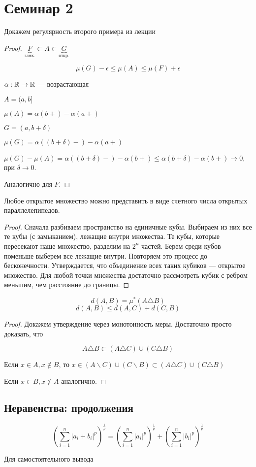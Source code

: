 \section{Семинар 2}

Докажем регулярность второго примера из лекции

\begin{proof}
  $\underbrace{F}_{\text{замк.}} \subset A \subset \underbrace{G}_{\text{откр.}}$

  $$\mu(G) - \epsilon \leq \mu(A) \leq \mu(F) + \epsilon$$

  $\alpha: \mathbb{R} \to \mathbb{R}$ --- возрастающая

  $A = (a, b]$

  $\mu(A) = \alpha(b+) - \alpha(a+)$

  $G = (a, b+\delta)$

  $\mu(G) = \alpha((b + \delta)-) - \alpha(a+)$

  $\mu(G) - \mu(A) = \alpha((b + \delta)-) - \alpha(b+) \leq \alpha(b + \delta) - \alpha(b+) \to 0$, при $\delta \to 0$.

  Аналогично для $F$.
\end{proof}

\begin{theorem}
  Любое открытое множество можно представить в виде счетного числа открытых параллелепипедов.
\end{theorem}

\begin{proof}
  Сначала разбиваем пространство на единичные кубы. Выбираем из них все те кубы (с замыканием), лежащие внутри множества.
  Те кубы, которые пересекают наше множество, разделим на $2^n$ частей. Берем среди кубов поменьше выберем все лежащие внутри.
  Повторяем это процесс до бесконечности. Утверждается, что объединение всех таких кубиков --- открытое множество. 
  Для любой точки множества достаточно рассмотреть кубик с ребром меньшим, чем расстояние до границы. 
\end{proof}

\begin{problem}
  $$d(A, B) = \mu^*(A \triangle B)$$
  $$d(A, B) \leq d(A, C) + d(C, B)$$
\end{problem}

\begin{proof}
  Докажем утверждение через монотонность меры.
  Достаточно просто доказать, что 

  $$A\triangle B \subset (A\triangle C) \cup (C\triangle B)$$

  Если $x \in A, x\notin B$, то $x \in (A\backslash C) \cup (C \backslash B) \subset (A\triangle C) \cup (C\triangle B)$
  
  Если $x \in B, x\notin A$ аналогично.
\end{proof}


\subsection{Неравенства: продолжения}

\begin{theorem}[Минковский]
  $$\left(\sum_{i = 1}^{n} |a_i + b_i|^p\right)^\frac{1}{p} = \left(\sum_{i = 1}^{n} |a_i|^p\right)^\frac{1}{p} + \left(\sum_{i = 1}^{n} |b_i|^p\right)^\frac{1}{p}$$
\end{theorem}

Для самостоятельного вывода


